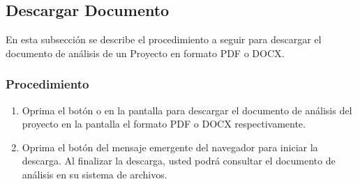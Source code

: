 \subsection{Descargar Documento}

En esta subsección se describe el procedimiento a seguir para descargar el documento de análisis de un Proyecto en formato PDF o DOCX.


\subsubsection{Procedimiento}

\begin{enumerate}
	\item Oprima el botón \btnPdf o \btnDocx en la pantalla  para descargar el documento de análisis del proyecto en la pantalla el formato PDF o DOCX respectivamente.
	\item Oprima el botón  del mensaje emergente del navegador para iniciar la descarga. Al finalizar la descarga, usted podrá consultar el documento de análisis en su sistema de archivos.
\end{enumerate}

